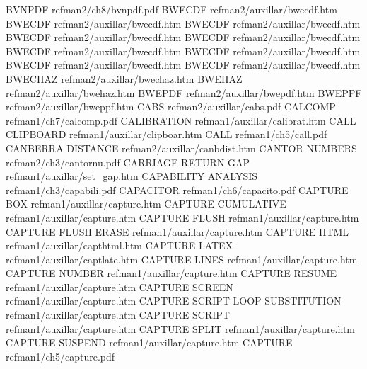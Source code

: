 BVNPDF                                  refman2/ch8/bvnpdf.pdf
BWECDF                                  refman2/auxillar/bwecdf.htm
BWECDF                                  refman2/auxillar/bwecdf.htm
BWECDF                                  refman2/auxillar/bwecdf.htm
BWECDF                                  refman2/auxillar/bwecdf.htm
BWECDF                                  refman2/auxillar/bwecdf.htm
BWECDF                                  refman2/auxillar/bwecdf.htm
BWECDF                                  refman2/auxillar/bwecdf.htm
BWECDF                                  refman2/auxillar/bwecdf.htm
BWECDF                                  refman2/auxillar/bwecdf.htm
BWECHAZ                                 refman2/auxillar/bwechaz.htm
BWEHAZ                                  refman2/auxillar/bwehaz.htm
BWEPDF                                  refman2/auxillar/bwepdf.htm
BWEPPF                                  refman2/auxillar/bweppf.htm
CABS                                    refman2/auxillar/cabs.pdf
CALCOMP                                 refman1/ch7/calcomp.pdf
CALIBRATION                             refman1/auxillar/calibrat.htm
CALL CLIPBOARD                          refman1/auxillar/clipboar.htm
CALL                                    refman1/ch5/call.pdf
CANBERRA DISTANCE                       refman2/auxillar/canbdist.htm
CANTOR NUMBERS                          refman2/ch3/cantornu.pdf
CARRIAGE RETURN GAP                     refman1/auxillar/set_gap.htm
CAPABILITY ANALYSIS                     refman1/ch3/capabili.pdf
CAPACITOR                               refman1/ch6/capacito.pdf
CAPTURE BOX                             refman1/auxillar/capture.htm
CAPTURE CUMULATIVE                      refman1/auxillar/capture.htm
CAPTURE FLUSH                           refman1/auxillar/capture.htm
CAPTURE FLUSH ERASE                     refman1/auxillar/capture.htm
CAPTURE HTML                            refman1/auxillar/capthtml.htm
CAPTURE LATEX                           refman1/auxillar/captlate.htm
CAPTURE LINES                           refman1/auxillar/capture.htm
CAPTURE NUMBER                          refman1/auxillar/capture.htm
CAPTURE RESUME                          refman1/auxillar/capture.htm
CAPTURE SCREEN                          refman1/auxillar/capture.htm
CAPTURE SCRIPT LOOP SUBSTITUTION        refman1/auxillar/capture.htm
CAPTURE SCRIPT                          refman1/auxillar/capture.htm
CAPTURE SPLIT                           refman1/auxillar/capture.htm
CAPTURE SUSPEND                         refman1/auxillar/capture.htm
CAPTURE                                 refman1/ch5/capture.pdf
